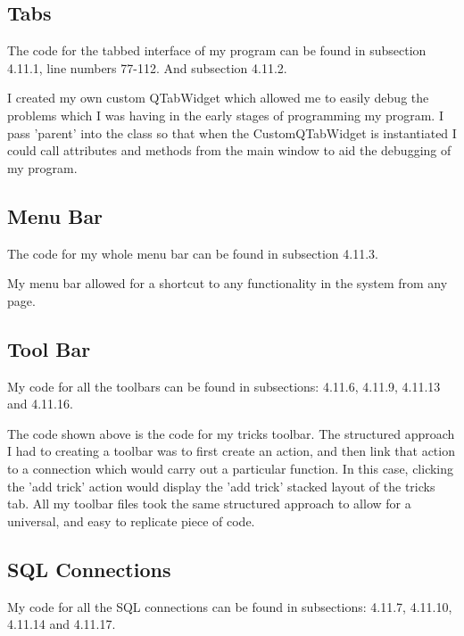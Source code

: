 \subsection{Tabs}

The code for the tabbed interface of my program can be  found in subsection 4.11.1, line numbers 77-112. And subsection 4.11.2.


I created my own custom QTabWidget which allowed me to easily debug the problems which I was having in the early stages of programming my program. I pass 'parent' into the class so that when the CustomQTabWidget is instantiated I could call attributes and methods from the main window to aid the debugging of my program.
\subsection{Menu Bar}

The code for my whole menu bar can be found in subsection 4.11.3.

My menu bar allowed for a shortcut to any functionality in the system from any page.

\subsection{Tool Bar}

My code for all the toolbars can be found in subsections: 4.11.6, 4.11.9, 4.11.13 and 4.11.16.


The code shown above is the code for my tricks toolbar. The structured approach I had to creating a toolbar was to first create an action, and then link that action to a connection which would carry out a particular function. In this case, clicking the 'add trick' action would display the 'add trick' stacked layout of the tricks tab. All my toolbar files took the same structured approach to allow for a universal, and easy to replicate piece of code.

\subsection{SQL Connections}

My code for all the SQL connections can be found in subsections: 4.11.7, 4.11.10, 4.11.14 and 4.11.17.


